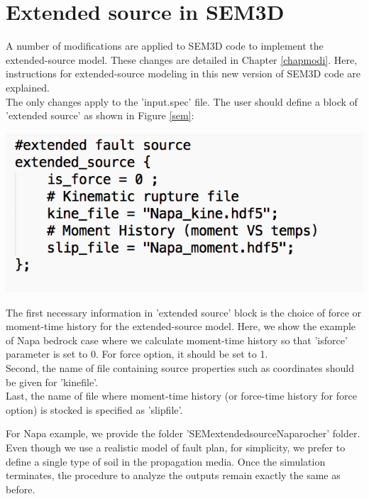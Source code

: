 \chapter{Extended source in SEM3D}

A number of modifications are applied to SEM3D code to implement the extended-source model. These changes are detailed in Chapter \ref{chapmodi}. Here, instructions for extended-source modeling in this new version of SEM3D code are explained. \\


The only changes apply to the 'input.spec' file. The user should define a block of 'extended source' as shown in Figure \ref{sem}: \\


\begin{center}
\leavevmode
\includegraphics[scale=0.5]{figures/input-moment.png} 
\label{sem} 
\vspace{1cm}
\end{center}



The first necessary information in 'extended source' block is the choice of force or moment-time history for the extended-source model. Here, we show the example of Napa bedrock case where we calculate moment-time history so that 'is\textunderscore force' parameter is set to 0. For force option, it should be set to 1. \\


Second, the name of file containing source properties such as coordinates should be given for 'kine\textunderscore file'. \\

Last, the name of file where moment-time history (or force-time history for force option) is stocked is specified as 'slip\textunderscore file'.


For Napa example, we provide the folder 'SEM\textunderscore extended\textunderscore source\textunderscore Napa\textunderscore rocher' folder. Even though we use a realistic model of fault plan, for simplicity, we prefer to define a single  type of soil in the propagation media. Once the simulation terminates, the procedure to analyze the outputs remain exactly the same as before. \\

















 